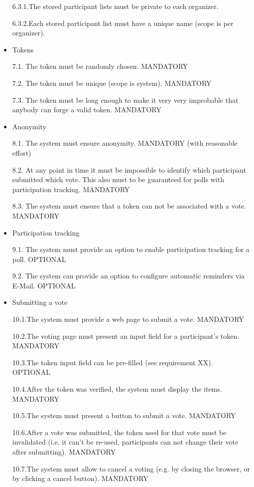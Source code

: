 \begin{itemize}
6.3.1.The stored participant lists must be private to each organizer.


6.3.2.Each stored participant list must have a unique name (scope is per organizer).


\item Tokens


7.1. The token must be randomly chosen. MANDATORY


7.2. The token must be unique (scope is system). MANDATORY


7.3. The token must be long enough to make it very very improbable that anybody can forge a
valid token. MANDATORY


\item Anonymity


8.1. The system must ensure anonymity. MANDATORY (with reasonable effort)


8.2. At any point in time it must be impossible to identify which participant submitted which vote.
This also must to be guaranteed for polls with participation tracking. MANDATORY


8.3. The system must ensure that a token can not be associated with a vote. MANDATORY


\item Participation tracking


9.1. The system must provide an option to enable participation tracking for a poll. OPTIONAL


9.2. The system can provide an option to configure automatic reminders via E-Mail. OPTIONAL


\item Submitting a vote


10.1.The system must provide a web page to submit a vote. MANDATORY


10.2.The voting page must present an input field for a participant’s token. MANDATORY


10.3.The token input field can be pre-filled (see requirement XX). OPTIONAL


10.4.After the token was verified, the system must display the items. MANDATORY


10.5.The system must present a button to submit a vote. MANDATORY


10.6.After a vote was submitted, the token used for that vote must be invalidated (i.e. it can’t be
re-used, participants can not change their vote after submitting). MANDATORY


10.7.The system must allow to cancel a voting (e.g. by closing the browser, or by clicking a cancel
button). MANDATORY



\end{itemize}
